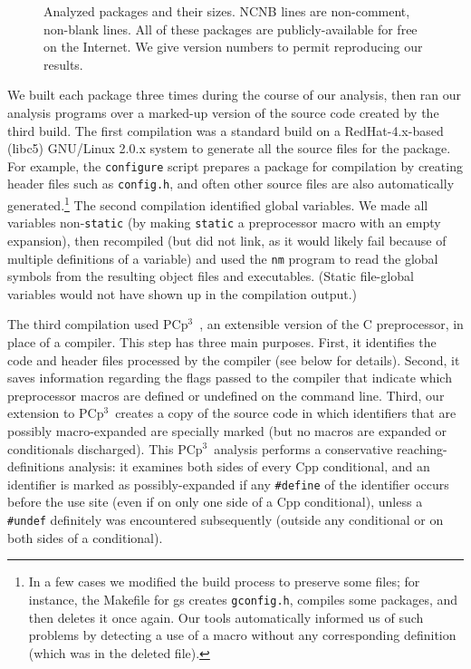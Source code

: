 \documentclass[10pt]{article}
\newcommand{\pcp}{\mbox{\textsf{PCp}$^3$}}
\newcommand{\pkg}[1]{\textsf{#1}}
\newcommand{\file}[1]{\texttt{#1}}
\newcommand{\ppd}[1]{\texttt{\##1}}
\newcommand{\captionsmall}[1]{\caption[]{\small #1}}
\begin{document}
\begin{figure}
\centering
{\small
  \setlength{\tabcolsep}{.25em}
  
}
\captionsmall{Analyzed packages and their sizes.  NCNB lines are non-comment,
  non-blank lines.  All of these packages are publicly-available for free
  on the Internet.  We give version numbers to permit reproducing our results.}
\label{fig:packages}
\end{figure}

We built each package three times during the course of our analysis, then
ran our analysis programs over a marked-up version of the source code
created by the third build.  The first compilation was a standard build on
a RedHat-4.x-based (libc5) GNU/Linux 2.0.x system to generate all the source files for
the package.  For example, the {\tt configure} script prepares a package
for compilation by creating header files such as \file{config.h}, and
often other source files are also automatically generated.\footnote{In a
  few cases we  modified the build process to preserve some files; for
  instance, the Makefile for \pkg{gs} creates \file{gconfig.h}, compiles
  some packages, and then deletes it once again.  Our tools automatically
  informed us of such problems by detecting a use of a macro
  without any corresponding definition (which was in the deleted file).}
The second compilation identified global variables.  We made all variables
non-{\tt static} (by making {\tt static} a preprocessor macro with an empty
expansion), then recompiled (but did not link, as it would likely fail because of multiple
definitions of a variable) and used the {\tt nm} program to read the global
symbols from the resulting object files and executables.  (Static file-global
variables would not have shown up in the compilation output.)


The third compilation used \pcp{}~\cite{CppAwareCAnalyses}, an extensible
version of the C preprocessor, in place of a compiler.  This step has three
main purposes.  First, it identifies the code and header files processed by
the compiler (see below for details).  Second, it saves information regarding the flags passed to the
compiler that indicate which preprocessor macros are defined or undefined on the
command line.  Third, our extension to \pcp\ creates a copy of the source
code in which identifiers that are possibly macro-expanded are specially
marked (but no macros are expanded or conditionals discharged).  This \pcp\ 
analysis performs a conservative reaching-definitions analysis:  it
examines both sides of every Cpp conditional, and an identifier is marked
as possibly-expanded if any \ppd{define} of the identifier occurs before
the use site (even if on only one side of a Cpp conditional), unless a
\ppd{undef} definitely was encountered subsequently (outside any
conditional or on both sides of a conditional).
\end{document}
